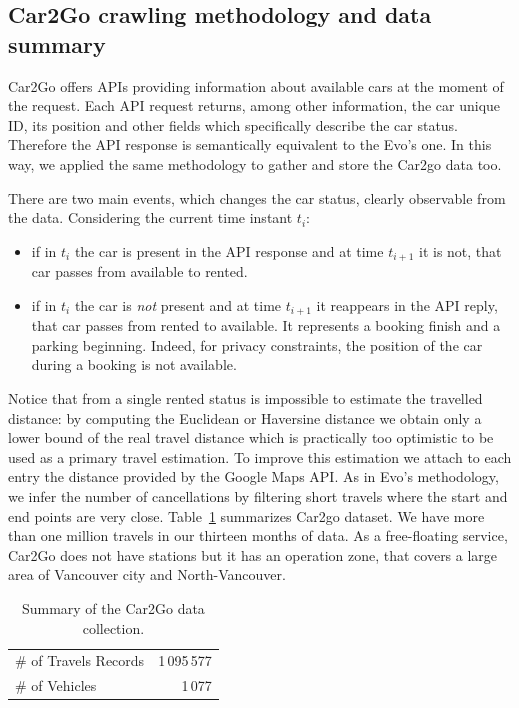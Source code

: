 \subsection{Car2Go crawling methodology and data summary}
\label{ss:4_5_datacollect}

Car2Go offers APIs providing information about available cars at the moment of the request. Each API request returns, among other information, the car unique ID, its position and other fields which specifically describe the car status. Therefore the API response is semantically equivalent to the Evo's one. In this way, we applied the same methodology to gather and store the Car2go data too.

There are two main events, which changes the car status, clearly observable from the data. Considering the current time instant $t_i$: 
\begin{itemize}
     \item if in $t_i$ the car is present in the API response and at time $t_{i+1}$ it is not, that car passes from available to rented. %
     \item if in $t_i$ the car is \emph{not} present and at time $t_{i+1}$ it reappears in the API reply, that car passes from rented  to available. It represents a booking finish and a parking beginning.  Indeed, for privacy constraints, the position of the car during a booking is not available.
\end{itemize}

Notice that from a single rented status is impossible to estimate the travelled distance: by computing the Euclidean or Haversine 
distance we obtain only a lower bound of the real travel distance which is practically too optimistic to be used as a primary travel estimation. To improve this estimation we attach to each entry the distance provided by the Google Maps API. 
As in Evo's methodology, we infer the number of cancellations by filtering short travels where the start and end points are very close. Table~\ref{table:dataCar2Go} summarizes Car2go dataset. We have more than one million travels in our thirteen months of data. As a free-floating service, Car2Go does not have stations but it has an operation zone, that covers a large area of Vancouver city and North-Vancouver. 

\begin{table}[htb]
	\centering
	\setlength{\tabcolsep}{2.3pt}
	\begin{tabular}{llr}
	\hline
	\multicolumn{2}{l}{\# of Travels Records} & 1\,095\,577\\
	\multicolumn{2}{l}{\# of Vehicles} & 1\,077
	\\\hline
	\end{tabular}
	\caption{Summary of the Car2Go data collection.}
	\label{table:dataCar2Go}
\end{table}